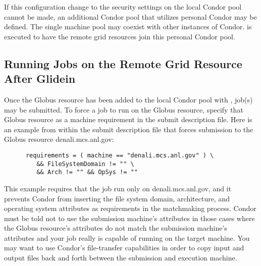 If this configuration change to the security settings on
the local Condor pool cannot be made,
an additional Condor pool that utilizes
personal Condor may be defined.
The single machine pool
may coexist with other instances of Condor.
 is executed to have the remote grid
resources join this personal Condor pool.

\subsection{Running Jobs on the Remote Grid Resource After Glidein }

Once the Globus resource has been added to the local Condor
pool with ,
job(s) may be submitted.
To force a job to run on the Globus resource,
specify that Globus resource as a machine requirement
in the submit description file. 
Here is an example from within the submit description file
that forces submission to the Globus resource denali.mcs.anl.gov:
\begin{verbatim}
      requirements = ( machine == "denali.mcs.anl.gov" ) \
         && FileSystemDomain != "" \
         && Arch != "" && OpSys != ""
\end{verbatim}
This example requires that the job run only on denali.mcs.anl.gov,
and it prevents Condor from inserting the file system domain,
architecture, and operating system attributes as requirements
in the matchmaking process.
Condor must be told not to use the submission machine's
attributes in those cases
where the Globus resource's attributes
do not match the submission machine's attributes and your job
really is capable of running on the target machine.  You
may want to use Condor's file-transfer capabilities in order
to copy input and output files back and forth between the submission
and execution machine.
